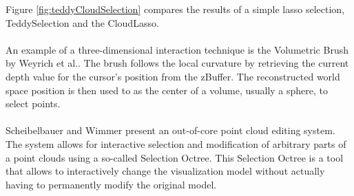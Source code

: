 Figure \ref{fig:teddyCloudSelection} compares the results of a simple lasso selection, TeddySelection and the CloudLasso. 
\\
\\
An example of a three-dimensional interaction technique is the Volumetric Brush by Weyrich et al.\cite{weyrich2004post}. The brush follows the local curvature by retrieving the current depth value for the cursor's position from the zBuffer. The reconstructed world space position is then used to as the center of a volume, usually a sphere, to select points. 
\\
\\
Scheibelbauer and Wimmer \cite{scheiblauer2011out} present an out-of-core point cloud editing system. The system allows for interactive selection and modification of arbitrary parts of a point clouds using a so-called Selection Octree. This Selection Octree is a tool that allows to interactively change the visualization model without actually having to permanently modify the original model. 
